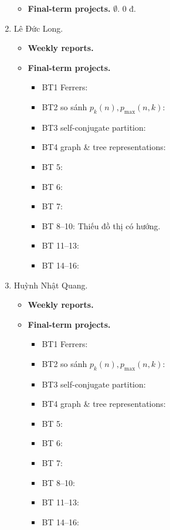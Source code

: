 \documentclass{article}
\begin{document}
\begin{enumerate}
\begin{itemize}
        \item {\bf Final-term projects.} $\emptyset$. 0 đ.
    \end{itemize}
    \item {\sc Lê Đức Long.}
    \begin{itemize}
        \item {\bf Weekly reports.}
        \item {\bf Final-term projects.}
        \begin{itemize}
            \item BT1 Ferrers:
            \item BT2 so sánh $p_k(n),p_{\max}(n,k)$:
            \item BT3 self-conjugate partition:
            \item BT4 graph \& tree representations:
            \item BT 5:
            \item BT 6:
            \item BT 7:
            \item BT 8--10: Thiếu đồ thị có hướng.
            \item BT 11--13:
            \item BT 14--16:
        \end{itemize}
    \end{itemize}
    \item {\sc Huỳnh Nhật Quang.}
    \begin{itemize}
        \item {\bf Weekly reports.}
        \item {\bf Final-term projects.}
        \begin{itemize}
            \item BT1 Ferrers:
            \item BT2 so sánh $p_k(n),p_{\max}(n,k)$:
            \item BT3 self-conjugate partition:
            \item BT4 graph \& tree representations:
            \item BT 5:
            \item BT 6:
            \item BT 7:
            \item BT 8--10:
            \item BT 11--13:
            \item BT 14--16:
        \end{itemize}
    \end{itemize}

\end{enumerate}
\end{document}

